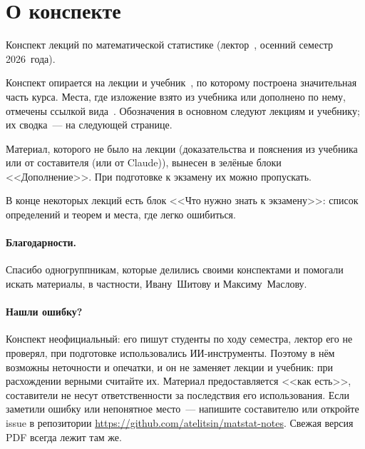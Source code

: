 \section*{О конспекте}

Конспект лекций по математической статистике (лектор~\lecturer, осенний семестр
2026~года).

Конспект опирается на лекции и учебник~\cite{bure}, по которому построена
значительная часть курса. Места, где изложение взято из учебника или
дополнено по нему, отмечены ссылкой вида~\cite[гл.~13, §4]{bure}.
Обозначения в основном следуют лекциям и учебнику; их сводка~--- на следующей странице.

Материал, которого не было на лекции (доказательства и пояснения из учебника
или от составителя (или от Claude)), вынесен в зелёные блоки <<Дополнение>>. При подготовке
к экзамену их можно пропускать.

В конце некоторых лекций есть блок <<Что нужно знать к экзамену>>: список
определений и теорем и места, где легко ошибиться.

\paragraph{Благодарности.} Спасибо одногруппникам, которые делились своими
конспектами и помогали искать материалы, в частности, Ивану~Шитову и Максиму~Маслову.

\paragraph{Нашли ошибку?} Конспект неофициальный: его пишут студенты по ходу
семестра, лектор его не проверял, при подготовке использовались ИИ-инструменты.
Поэтому в нём возможны неточности и опечатки, и он не заменяет лекции и учебник:
при расхождении верными считайте их. Материал предоставляется <<как есть>>,
составители не несут ответственности за последствия его использования.
Если заметили ошибку или непонятное место~--- напишите составителю или
откройте issue в репозитории \url{https://github.com/atelitsin/matstat-notes}.
Свежая версия PDF всегда лежит там же.

\clearpage
